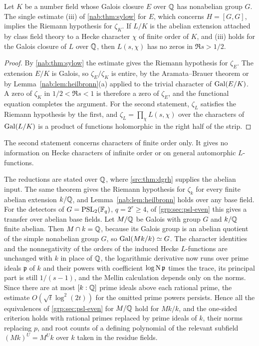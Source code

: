 \begin{corollary}\label{nab:cor:any}
Let $K$ be a number field whose Galois closure $E$ over $\mathbb{Q}$ has nonabelian group $G$. The
single estimate \textup{(iii)} of \cref{nab:thm:sylow} for $E$, which concerns $H=[G,G]$,
implies the Riemann hypothesis for $\zeta_K$. If $L/K$ is the abelian extension attached by class field theory
to a Hecke character $\chi$ of finite order of $K$, and \textup{(iii)} holds for the Galois
closure of $L$ over $\mathbb{Q}$, then $L(s,\chi)$ has no zeros in $\Re s>1/2$.
\end{corollary}
\begin{proof}
By \cref{nab:thm:sylow} the estimate gives the Riemann hypothesis for $\zeta_E$. The
extension $E/K$ is Galois, so $\zeta_E/\zeta_K$ is entire, by the Aramata--Brauer
theorem \cite{Brauer1947Zeta} or by Lemma~\ref{nab:lem:heilbronn}(a) applied to the
trivial character of $\operatorname{Gal}(E/K)$. A zero of $\zeta_K$ in $1/2<\Re s<1$ is therefore a zero of $\zeta_E$, and the
functional equation completes the argument. For the second statement, $\zeta_L$ satisfies
the Riemann hypothesis by the first, and $\zeta_L=\prod_\chi L(s,\chi)$ over the characters
of $\operatorname{Gal}(L/K)$ is a product of functions holomorphic in the right half of the strip.
\end{proof}

The second statement concerns characters of finite order only. It gives no information on
Hecke characters of infinite order or on general automorphic $L$-functions.

\begin{remark}\label{nab:rem:basechange}
The reductions are stated over $\mathbb{Q}$, where \cref{src:thm:dgrh} supplies the abelian input.
The same theorem gives the Riemann hypothesis for $\zeta_k$ for every finite abelian
extension $k/\mathbb{Q}$, and Lemma~\ref{nab:lem:heilbronn} holds over any base field. For the
detectors of $G=\operatorname{PSL}_2(\mathbb{F}_q)$, $q=2^r\ge4$, of \cref{grp:sec:psl-even} this gives a transfer over
abelian base fields. Let $M/\mathbb{Q}$ be Galois with group $G$ and $k/\mathbb{Q}$ finite abelian. Then
$M\cap k=\mathbb{Q}$, because its Galois group is an abelian quotient of the simple nonabelian
group $G$, so $\operatorname{Gal}(Mk/k)\simeq G$. The character identities and the nonnegativity of the
orders of the induced Hecke $L$-functions are unchanged with $k$ in place of $\mathbb{Q}$, the
logarithmic derivative now runs over prime ideals $\mathfrak p$ of $k$ and their powers
with coefficient $\log\operatorname{N}\mathfrak p$ times the trace, its principal part is still
$1/(s-1)$, and the Mellin calculation depends only on the norms. Since there are at most
$[k:\mathbb{Q}]$ prime ideals above each rational prime, the estimate
$O(\sqrt t\log^2(2t))$ for the omitted prime powers persists. Hence all the equivalences
of \cref{grp:sec:psl-even} for $M/\mathbb{Q}$ hold for $Mk/k$, and the one-sided criterion holds with
rational primes replaced by prime ideals of $k$, their norms replacing $p$, and root
counts of a defining polynomial of the relevant subfield $(Mk)^{U}=M^{U}k$ over $k$ taken
in the residue fields.
\end{remark}



